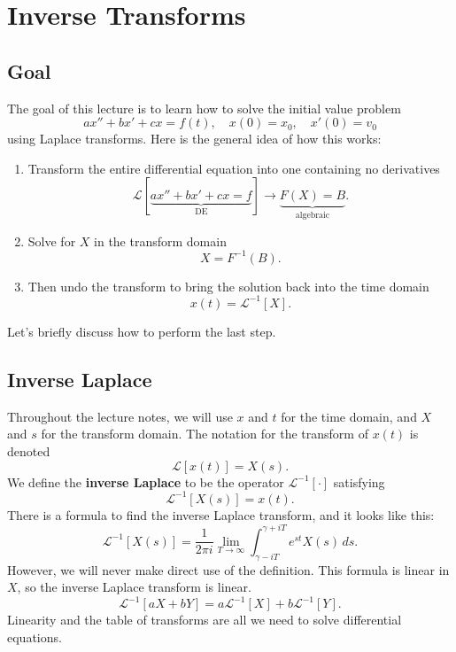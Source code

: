 \documentclass[10pt,letterpaper]{article}
\begin{document}

\section{Inverse Transforms}


\subsection{Goal}
The goal of this lecture is to learn how to solve the initial value problem
$$
ax''+bx'+cx=f(t),\quad x(0)=x_0,\quad x'(0)=v_0
$$
using Laplace transforms. Here is the general idea of how this works:
\begin{enumerate}
    \item Transform the entire differential equation into one containing no derivatives 
        $$
        \mathcal{L}[\underbrace{ax''+bx'+cx=f}_{\text{DE}}] \to \underbrace{F(X) = B}_{\text{algebraic}}.
        $$
    \item Solve for $X$ in the transform domain
        $$
            X = F^{-1}(B).
        $$
    \item Then undo the transform to bring the solution back into the time domain 
        $$
            x(t) = \mathcal{L}^{-1}\left[ X\right].
        $$
\end{enumerate}
Let's briefly discuss how to perform the last step. 

\subsection{Inverse Laplace}
Throughout the lecture notes, we will use $x$ and $t$ for the time domain, and $X$ and $s$ for the transform domain. The notation for the transform of $x(t)$ is denoted
$$
\mathcal{L}\left[x(t)\right]= X(s). 
$$
We define the \textbf{inverse Laplace} to be the operator $\mathcal{L}^{-1}\left[\cdot \right]$ satisfying
\[
\mathcal{L}^{-1}[X(s)]=x(t).
\]
There is a formula to find the inverse Laplace transform, and it looks like this:
\[
\mathcal{L}^{-1}[X(s)]
= \frac{1}{2\pi i}\lim_{T\to\infty}
\int_{\gamma - iT}^{\gamma + iT} e^{st} X(s)\,ds .
\]
However, we will never make direct use of the definition. This formula is linear in \(X\), so the inverse Laplace transform is linear.
$$
\mathcal{L}^{-1}[aX+bY] = a\mathcal{L}^{-1}[X]+b\mathcal{L}^{-1}[Y].
$$
Linearity and the table of transforms are all we need to solve differential equations.
\end{document}

